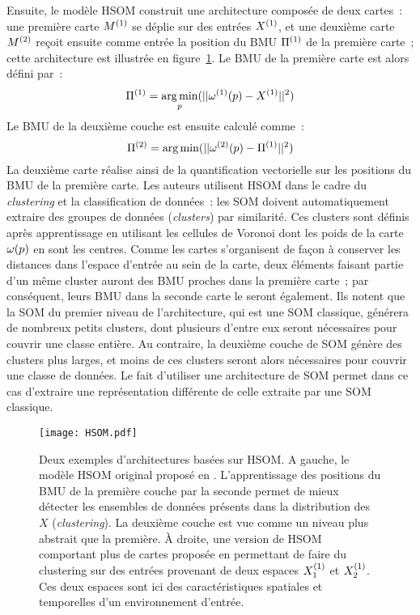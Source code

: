 \documentclass[../main]{subfiles}
\begin{document}
Ensuite, le modèle HSOM \parencite{lampinen_clustering_1992} construit une architecture composée de deux cartes~: une première carte $M^{({1})}$ se déplie sur des entrées $X^{({1})}$, et une deuxième carte $M^{({2})}$ reçoit ensuite comme entrée la position du BMU $\Pi^{({1})}$ de la première carte~; cette architecture est illustrée en figure~\ref{fig:hsom}.
Le BMU de la première carte est alors défini par~:
$$ \Pi^{({1})} = \operatorname*{arg\,min}_p(||\omega^{({1})}(p) - X^{({1})} || ^2)$$
Le BMU de la deuxième couche est ensuite calculé comme~:
$$ \Pi^{({2})}= \operatorname*{arg\,min}(||\omega^{({2})}(p) - \Pi^{({1})} || ^2)$$
La deuxième carte réalise ainsi de la quantification vectorielle sur les positions du BMU de la première carte. Les auteurs utilisent HSOM dans le cadre du \emph{clustering} et la classification de données~: les SOM doivent automatiquement extraire des groupes de données (\emph{clusters}) par similarité. Ces clusters sont définis après apprentissage en utilisant les cellules de Voronoi dont les poids de la carte $\omega(p)$ en sont les centres.
Comme les cartes s'organisent de façon à conserver les distances dans l'espace d'entrée au sein de la carte, deux éléments faisant partie d'un même cluster auront des BMU proches dans la première carte~; par conséquent, leurs BMU dans la seconde carte le seront également. 
Ils notent que la SOM du premier niveau de l'architecture, qui est une SOM classique, générera de nombreux petits clusters, dont plusieurs d'entre eux seront nécessaires pour couvrir une classe entière. Au contraire, la deuxième couche de SOM génère des clusters plus larges, et moins de ces clusters seront alors nécessaires pour couvrir une classe de données.
Le fait d'utiliser une architecture de SOM permet dans ce cas d'extraire une représentation différente de celle extraite par une SOM classique.

\begin{figure}[t]
    \centering
    \texttt{[image: HSOM.pdf]}
    \caption{Deux exemples d'architectures basées sur HSOM. A gauche, le modèle HSOM original proposé en \cite{lampinen_clustering_1992}. L'apprentissage des positions du BMU de la première couche par la seconde permet de mieux détecter les ensembles de données présents dans la distribution des $X$ (\emph{clustering}).
    La deuxième couche est vue comme un niveau plus abstrait que la première. 
    \`A droite, une version de HSOM comportant plus de cartes proposée en \cite{hagenauer_hierarchical_2013} permettant de faire du clustering sur des entrées provenant de deux espaces $X_1^{({1})}$ et $X_2^{({1})}$. Ces deux espaces sont ici des caractéristiques spatiales et temporelles d'un environnement d'entrée.
    \label{fig:hsom}}
\end{figure}
\end{document}
